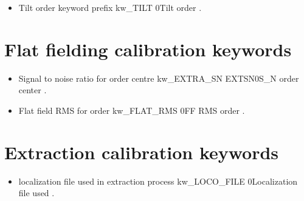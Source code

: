 \begin{itemize}

\item {}
{Tilt order keyword prefix}
{kw\_TILT}
{}{0}{Tilt order}
{\calSLIT}{\spirouKeywords}{\calSLIT.\progMAIN}

\end{itemize}





\section{Flat fielding calibration keywords}
\label{ch:output_keywords:flatfielding}

\begin{itemize}

\item {}
{Signal to noise ratio for order centre}
{kw\_EXTRA\_SN}
{EXTSN}{0}{S\_N order center}
{\calFFraw}{\spirouKeywords}{\calFFraw.\progMAIN}


\item {}
{Flat field RMS for order}
{kw\_FLAT\_RMS}
{}{0}{FF RMS order}
{\calFFraw}{\spirouKeywords}{\calFFraw.\progMAIN}

\end{itemize}





\section{Extraction calibration keywords}
\label{ch:output_keywords:extraction}

\begin{itemize}

\item {}
{localization file used in extraction process}
{kw\_LOCO\_FILE}
{}{0}{Localization file used}
{\calextractRAW}{\spirouKeywords}{\calextractRAW.\progMAIN}

\end{itemize}





